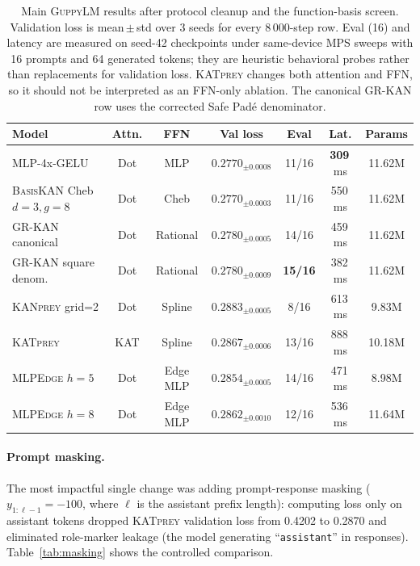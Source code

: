 \documentclass{article}
\newcommand{\mlpedge}{\textsc{MLPEdge}}
\newcommand{\kanprey}{\textsc{KANprey}}
\newcommand{\katprey}{\textsc{KATprey}}
\newcommand{\guppylm}{\textsc{GuppyLM}}
\newcommand{\grkan}{\textsc{GR-KAN}}
\newcommand{\basiskan}{\textsc{BasisKAN}}
\begin{document}
\begin{table}[h]
\centering
\scriptsize
\caption{%
  Main \guppylm{} results after protocol cleanup and the function-basis screen.
  Validation loss is mean\,$\pm$\,std over 3 seeds for every 8\,000-step row.
  Eval (16) and latency are measured on seed-42 checkpoints under same-device
  MPS sweeps with 16 prompts and 64 generated tokens; they are heuristic
  behavioral probes rather than replacements for validation loss.
  \katprey{} changes both attention and FFN, so it should not be interpreted
  as an FFN-only ablation.
  The canonical \grkan{} row uses the corrected Safe Pad\'{e} denominator.
}
\label{tab:main}
\begin{tabular}{@{}lcccccc@{}}
\toprule
Model & Attn. & FFN & Val loss & Eval & Lat. & Params \\
\midrule
MLP-4x-GELU & Dot & MLP & $\mathbf{0.2770}_{\pm 0.0008}$ & 11/16 & \textbf{309}\,ms & 11.62M \\
\basiskan{} Cheb $d=3,g=8$ & Dot & Cheb & $\mathbf{0.2770}_{\pm 0.0003}$ & 11/16 & 550\,ms & 11.62M \\
\grkan{} canonical & Dot & Rational & $0.2780_{\pm 0.0005}$ & 14/16 & 459\,ms & 11.62M \\
\grkan{} square denom. & Dot & Rational & $0.2780_{\pm 0.0009}$ & \textbf{15/16} & 382\,ms & 11.62M \\
\kanprey{} grid=2 & Dot & Spline & $0.2883_{\pm 0.0005}$ & 8/16 & 613\,ms & 9.83M \\
\katprey{} & KAT & Spline & $0.2867_{\pm 0.0006}$ & 13/16 & 888\,ms & 10.18M \\
\mlpedge{} $h=5$ & Dot & Edge MLP & $0.2854_{\pm 0.0005}$ & 14/16 & 471\,ms & 8.98M \\
\mlpedge{} $h=8$ & Dot & Edge MLP & $0.2862_{\pm 0.0010}$ & 12/16 & 536\,ms & 11.64M \\
\bottomrule
\end{tabular}
\end{table}

\paragraph{Prompt masking.}
The most impactful single change was adding prompt-response masking
($y_{1:\ell-1} = -100$, where $\ell$ is the assistant prefix length):
computing loss only on assistant tokens dropped \katprey{} validation
loss from 0.4202 to 0.2870 and eliminated role-marker leakage (the model
generating ``\texttt{assistant}'' in responses).
Table~\ref{tab:masking} shows the controlled comparison.
\end{document}
